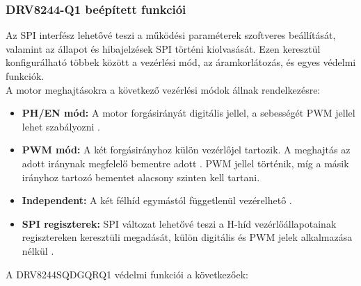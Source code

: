 \subsubsection{DRV8244-Q1 beépített funkciói}
Az SPI interfész lehetővé teszi a működési paraméterek szoftveres beállítását, valamint az állapot és
hibajelzések SPI történi kiolvasását. Ezen keresztül konfigurálható többek között a vezérlési mód, az áramkorlátozás,
és egyes védelmi funkciók.\vspace{0.2cm} \\
A motor meghajtásokra a következő vezérlési módok állnak rendelkezésre:
\begin{itemize}
    \item \textbf{PH/EN mód:} A motor forgásirányát digitális jellel, a sebességét PWM jellel lehet szabályozni \cite[35.~o., 8.3.2.1]{drv8244}.
    \item \textbf{PWM mód:} A két forgásirányhoz külön vezérlőjel tartozik. A meghajtás az adott iránynak megfelelő bementre adott \cite[35--36.~o., 8.3.2.2]{drv8244}.
    PWM jellel történik, míg a másik irányhoz tartozó bementet alacsony szinten kell tartani.
    \item \textbf{Independent:} A két félhíd egymástól függetlenül vezérelhető \cite[36--37.~o., 8.3.2.3]{drv8244}.
    \item \textbf{SPI regiszterek:} SPI változat lehetővé teszi a H-híd vezérlőállapotainak regisztereken keresztüli megadását,
    külön digitális és PWM jelek alkalmazása nélkül \cite[37.~o., 8.3.2.4]{drv8244}.
\end{itemize}
A DRV8244SQDGQRQ1 védelmi funkciói a következőek:
